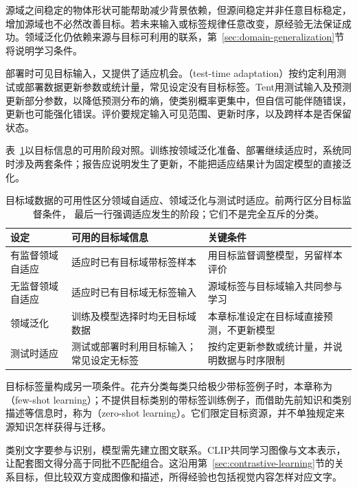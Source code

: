 源域之间稳定的物体形状可能帮助减少背景依赖，但源间稳定并非任意目标稳定，增加源域也不必然改善目标。若未来输入或标签规律任意改变，原经验无法保证成功。领域泛化仍依赖来源与目标可利用的联系，第~\ref{sec:domain-generalization}节将说明学习条件。

部署时可见目标输入，又提供了适应机会。（test-time adaptation）按约定利用测试或部署数据更新参数或统计量，常见设定没有目标标签。Tent用测试输入及预测更新部分参数，以降低预测分布的熵，使类别概率更集中，但自信可能伴随错误，更新也可能强化错误。评价要规定输入可见范围、更新时序，以及跨样本是否保留状态。

表~\ref{tab:domain-transfer-settings}以目标信息的可用阶段对照。训练按领域泛化准备、部署继续适应时，系统同时涉及两套条件；报告应说明发生了更新，不能把适应结果计为固定模型的直接泛化。

\begin{table}[htbp]
  \centering
  \small
  \begin{tabularx}{\linewidth}{@{}lXX@{}}
    \toprule
    \textbf{设定} & \textbf{可用的目标域信息} & \textbf{关键条件} \\
    \midrule
    有监督领域自适应 & 适应时已有目标域带标签样本 & 用目标监督调整模型，另留样本评价 \\
    无监督领域自适应 & 适应时已有目标域无标签输入 & 源域标签与目标域输入共同参与学习 \\
    领域泛化 & 训练及模型选择时均无目标域数据 & 本章标准设定在目标域直接预测，不更新模型 \\
    测试时适应 & 测试或部署时利用目标输入；常见设定无标签 & 按约定更新参数或统计量，并说明数据与时序限制 \\
    \bottomrule
  \end{tabularx}
  \caption{目标域数据的可用性区分领域自适应、领域泛化与测试时适应。前两行区分目标监督条件，
  最后一行强调适应发生的阶段；它们不是完全互斥的分类。}
  \label{tab:domain-transfer-settings}
\end{table}
\FloatBarrier

目标标签量构成另一项条件。花卉分类每类只给极少带标签例子时，本章称为（few-shot learning）；不提供目标类别的带标签训练例子，而借助先前知识和类别描述等信息时，称为（zero-shot learning）。它们限定目标资源，并不单独规定来源知识怎样获得与迁移。

类别文字要参与识别，模型需先建立图文联系。CLIP共同学习图像与文本表示，让配套图文得分高于同批不匹配组合。这沿用第~\ref{sec:contrastive-learning}节的关系目标，但比较双方变成图像和描述，所得经验也包括视觉内容怎样对应文字。

